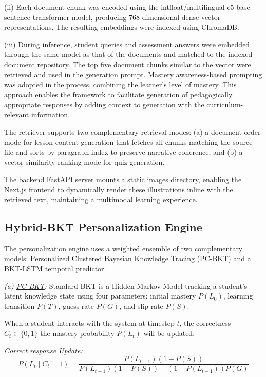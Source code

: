 \documentclass[conference]{IEEEtran}
\begin{document}
(ii) Each document chunk was encoded using the intfloat/multilingual-e5-base sentence transformer model, producing 768-dimensional dense vector representations. The resulting embeddings were indexed using ChromaDB.

(iii) During inference, student queries and assessment answers were embedded through the same model as that of the documents and matched to the indexed document repository. The top five document chunks similar to the vector were retrieved and used in the generation prompt. Mastery awareness-based prompting was adopted in the process, combining the learner's level of mastery. This approach enables the framework to facilitate generation of pedagogically appropriate responses by adding context to generation with the curriculum-relevant information.

The retriever supports two complementary retrieval modes: (a) a document order mode for lesson content generation that fetches all chunks matching the source file and sorts by paragraph index to preserve narrative coherence, and (b) a vector similarity ranking mode for quiz generation. 

The backend FastAPI server mounts a static images directory, enabling the Next.js frontend to dynamically render these illustrations inline with the retrieved text, maintaining a multimodal learning experience.

\subsection{Hybrid-BKT Personalization Engine}
The personalization engine uses a weighted ensemble of two complementary models: Personalized Clustered Bayesian Knowledge Tracing (PC-BKT) and a BKT-LSTM temporal predictor.

\textit{(a) \underline{PC-BKT}:} Standard BKT is a Hidden Markov Model tracking a student's latent knowledge state using four parameters: initial mastery $P(L_0)$, learning transition $P(T)$, guess rate $P(G)$, and slip rate $P(S)$.

When a student interacts with the system at timestep $t$, the correctness $C_t \in \{0, 1\}$ the mastery probability $P(L_t)$ will be updated.

\textit{Correct response Update:}
{\small
\begin{equation}
P( L_t \mid C_t = 1 ) = \frac{P(L_{t-1})(1 - P(S))}{P(L_{t-1})(1 - P(S)) + (1 - P(L_{t-1}))P(G)}
\end{equation}
}
\end{document}
